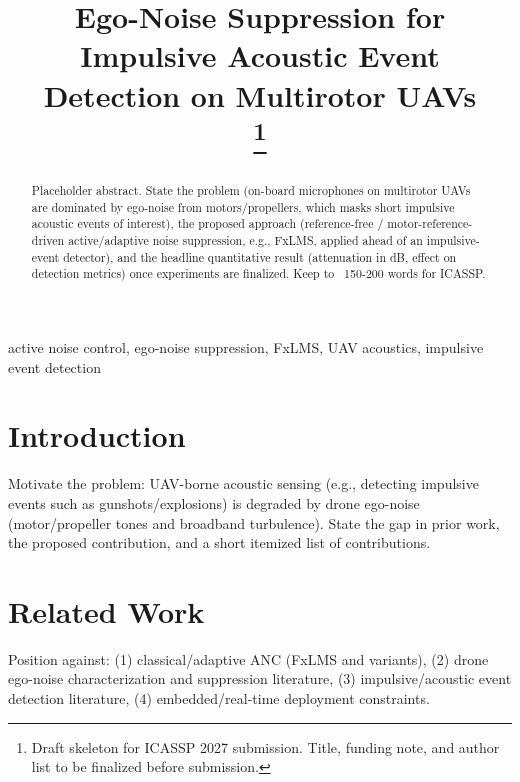 \documentclass[conference]{IEEEtran}
\begin{document}
\title{Ego-Noise Suppression for Impulsive Acoustic Event Detection on Multirotor UAVs\\\thanks{Draft skeleton for ICASSP 2027 submission. Title, funding note, and author list to be finalized before submission.}}

\author{
}

\maketitle

\begin{abstract}
Placeholder abstract. State the problem (on-board microphones on multirotor UAVs are dominated by ego-noise from motors/propellers, which masks short impulsive acoustic events of interest), the proposed approach (reference-free / motor-reference-driven active/adaptive noise suppression, e.g., FxLMS, applied ahead of an impulsive-event detector), and the headline quantitative result (attenuation in dB, effect on detection metrics) once experiments are finalized. Keep to ~150-200 words for ICASSP.
\end{abstract}

\begin{IEEEkeywords}
active noise control, ego-noise suppression, FxLMS, UAV acoustics, impulsive event detection
\end{IEEEkeywords}

\section{Introduction}
\label{sec:intro}
Motivate the problem: UAV-borne acoustic sensing (e.g., detecting impulsive events such as gunshots/explosions) is degraded by drone ego-noise (motor/propeller tones and broadband turbulence). State the gap in prior work, the proposed contribution, and a short itemized list of contributions.

\section{Related Work}
\label{sec:sota}
Position against: (1) classical/adaptive ANC (FxLMS and variants), (2) drone ego-noise characterization and suppression literature, (3) impulsive/acoustic event detection literature, (4) embedded/real-time deployment constraints.
\end{document}
